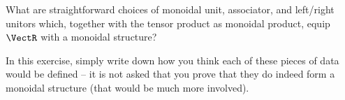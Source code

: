 
\begin{gradedexercise}
    \label{ex:VectTensorMonStructure}
    What are straightforward choices of monoidal unit, associator, and left/right unitors which, together with the tensor product as monoidal product, equip $\VectR$ with a monoidal structure?

    In this exercise, simply write down how you think each of these pieces of data would be defined -- it is not asked that you prove that they do indeed form a monoidal structure (that would be much more involved).
\end{gradedexercise}



